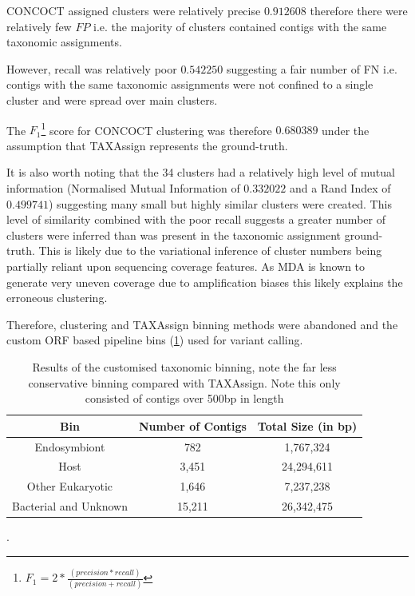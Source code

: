 CONCOCT assigned clusters were relatively precise \(0.912608\) 
therefore there were relatively few \(FP\) i.e. the majority of clusters 
contained contigs with the same taxonomic assignments. 

However, recall was relatively poor \(0.542250\) suggesting a
fair number of FN i.e. contigs with the same taxonomic assignments
were not confined to a single cluster and were spread over main clusters.

The \(F_1\)\footnote{\(F_1 = 2 * \frac{(precision * recall)}{(precision + recall)}\)} score for CONCOCT 
clustering was therefore \(0.680389\) under the assumption that 
TAXAssign represents the ground-truth. 

It is also worth noting that the 34 clusters had a relatively high level of mutual information
(Normalised Mutual Information of \(0.332022\) and a Rand Index of \(0.499741\)) suggesting
many small but highly similar clusters were created.  This level of similarity combined
with the poor recall suggests a greater number of clusters were inferred than was
present in the taxonomic assignment ground-truth.  This is likely due to
the variational inference of cluster numbers being partially reliant upon
sequencing coverage features.  As MDA is known to generate very uneven coverage 
due to amplification biases this likely explains the erroneous clustering.


Therefore, clustering and TAXAssign binning methods were abandoned and
the custom ORF based pipeline bins (\cref{tab:custom_tax_bin}) used
for variant calling.

\begin{table}
    \centering
    \begin{tabular}{|c|c|c|}
        \hline
        \textbf{Bin} & \textbf{Number of Contigs} & \textbf{Total Size (in bp)} \\
        \hline
        Endosymbiont & 782 & 1,767,324\\
        Host & 3,451 &  24,294,611 \\
        \hline
        Other Eukaryotic & 1,646 & 7,237,238\\
        Bacterial and Unknown & 15,211 & 26,342,475 \\
        \hline
    \end{tabular}
    \caption[Custom Taxonomic Binning]{Results of the customised taxonomic binning,
    note the far less conservative binning compared with TAXAssign. Note this only
consisted of contigs over 500bp in length}.
\label{tab:custom_tax_bin}
\end{table}

